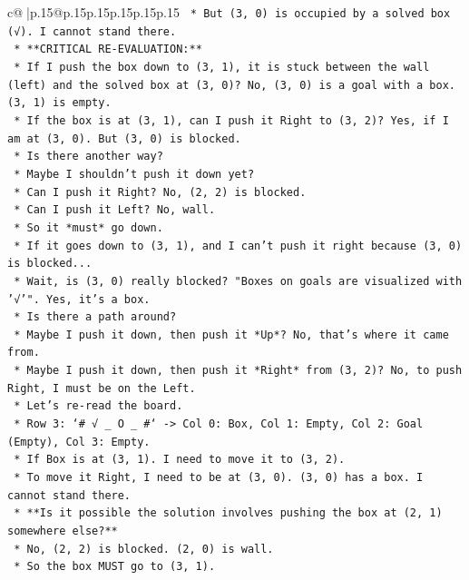 \documentclass{article}
\begin{document}
{\begin{supertabular}{c@{$\;$}|p{.15\linewidth}@{}p{.15\linewidth}p{.15\linewidth}p{.15\linewidth}p{.15\linewidth}p{.15\linewidth}}
{{{\texttt{    *   But (3, 0) is occupied by a solved box (√). I cannot stand there.} \\
\texttt{    *   **CRITICAL RE{-}EVALUATION:**} \\
\texttt{        *   If I push the box down to (3, 1), it is stuck between the wall (left) and the solved box at (3, 0)? No, (3, 0) is a goal with a box. (3, 1) is empty.} \\
\texttt{        *   If the box is at (3, 1), can I push it Right to (3, 2)? Yes, if I am at (3, 0). But (3, 0) is blocked.} \\
\texttt{        *   Is there another way?} \\
\texttt{        *   Maybe I shouldn't push it down yet?} \\
\texttt{        *   Can I push it Right? No, (2, 2) is blocked.} \\
\texttt{        *   Can I push it Left? No, wall.} \\
\texttt{        *   So it *must* go down.} \\
\texttt{        *   If it goes down to (3, 1), and I can't push it right because (3, 0) is blocked...} \\
\texttt{        *   Wait, is (3, 0) really blocked? "Boxes on goals are visualized with '√'". Yes, it's a box.} \\
\texttt{        *   Is there a path around?} \\
\texttt{        *   Maybe I push it down, then push it *Up*? No, that's where it came from.} \\
\texttt{        *   Maybe I push it down, then push it *Right* from (3, 2)? No, to push Right, I must be on the Left.} \\
\texttt{        *   Let's re{-}read the board.} \\
\texttt{        *   Row 3: `\# √ \_ O \_ \#` {-}> Col 0: Box, Col 1: Empty, Col 2: Goal (Empty), Col 3: Empty.} \\
\texttt{        *   If Box is at (3, 1). I need to move it to (3, 2).} \\
\texttt{        *   To move it Right, I need to be at (3, 0). (3, 0) has a box. I cannot stand there.} \\
\texttt{        *   **Is it possible the solution involves pushing the box at (2, 1) somewhere else?**} \\
\texttt{        *   No, (2, 2) is blocked. (2, 0) is wall.} \\
\texttt{        *   So the box MUST go to (3, 1).} \\
}}}
\end{supertabular}}
\end{document}

